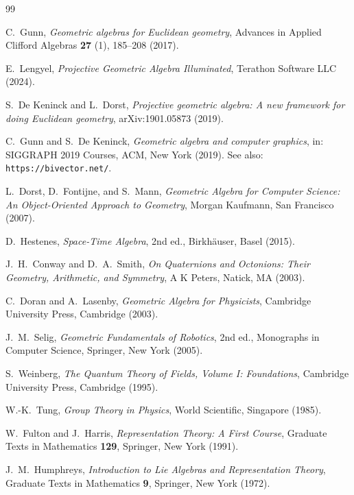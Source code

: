 \documentclass[a4paper]{article}
\begin{document}
\begin{thebibliography}{99}

C.~Gunn,
\textit{Geometric algebras for Euclidean geometry},
Advances in Applied Clifford Algebras \textbf{27} (1), 185--208 (2017).

E.~Lengyel,
\textit{Projective Geometric Algebra Illuminated},
Terathon Software LLC (2024).

S.~De Keninck and L.~Dorst,
\textit{Projective geometric algebra: A new framework for doing Euclidean geometry},
arXiv:1901.05873 (2019).

C.~Gunn and S.~De Keninck,
\textit{Geometric algebra and computer graphics},
in: SIGGRAPH 2019 Courses, ACM, New York (2019).
See also: \texttt{https://bivector.net/}.

L.~Dorst, D.~Fontijne, and S.~Mann,
\textit{Geometric Algebra for Computer Science: An Object-Oriented Approach to Geometry},
Morgan Kaufmann, San Francisco (2007).

D.~Hestenes,
\textit{Space-Time Algebra}, 2nd ed.,
Birkh\"{a}user, Basel (2015).

J.~H.~Conway and D.~A.~Smith,
\textit{On Quaternions and Octonions: Their Geometry, Arithmetic, and Symmetry},
A K Peters, Natick, MA (2003).

C.~Doran and A.~Lasenby,
\textit{Geometric Algebra for Physicists},
Cambridge University Press, Cambridge (2003).

J.~M.~Selig,
\textit{Geometric Fundamentals of Robotics}, 2nd ed.,
Monographs in Computer Science, Springer, New York (2005).

S.~Weinberg,
\textit{The Quantum Theory of Fields, Volume I: Foundations},
Cambridge University Press, Cambridge (1995).

W.-K.~Tung,
\textit{Group Theory in Physics},
World Scientific, Singapore (1985).

W.~Fulton and J.~Harris,
\textit{Representation Theory: A First Course},
Graduate Texts in Mathematics \textbf{129},
Springer, New York (1991).

J.~M.~Humphreys,
\textit{Introduction to Lie Algebras and Representation Theory},
Graduate Texts in Mathematics \textbf{9},
Springer, New York (1972).


\end{thebibliography}
\end{document}
